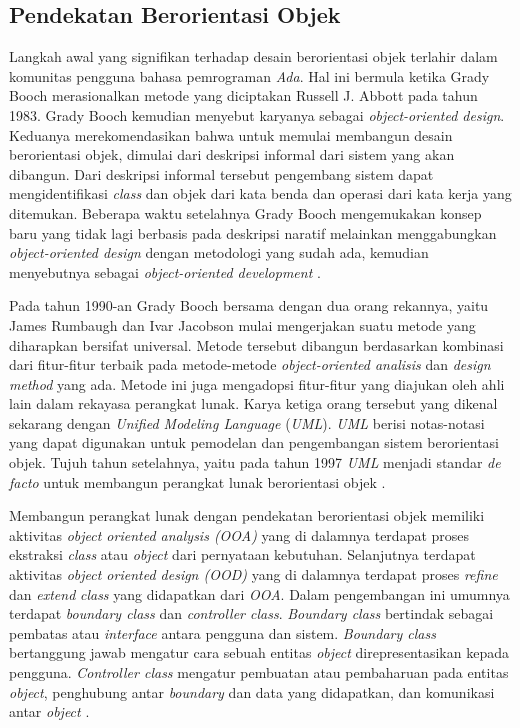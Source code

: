 \subsection{Pendekatan Berorientasi Objek}

Langkah awal yang signifikan terhadap desain berorientasi objek
terlahir dalam komunitas pengguna bahasa pemrograman \emph{Ada}. Hal
ini bermula ketika Grady Booch merasionalkan metode yang diciptakan
Russell J. Abbott pada tahun 1983. Grady Booch kemudian menyebut
karyanya sebagai \emph{object-oriented design}. Keduanya
merekomendasikan bahwa untuk memulai membangun desain berorientasi
objek, dimulai dari deskripsi informal dari sistem yang
akan dibangun. Dari deskripsi informal tersebut pengembang
sistem dapat mengidentifikasi \emph{class} dan objek dari kata benda dan
operasi dari kata kerja yang ditemukan. Beberapa waktu setelahnya
Grady Booch mengemukakan konsep baru yang tidak lagi berbasis pada
deskripsi naratif melainkan menggabungkan \emph{object-oriented
  design} dengan metodologi yang sudah ada, kemudian menyebutnya
sebagai \emph{object-oriented development}
\parencite{capretz2003history}.

Pada tahun 1990-an Grady Booch bersama dengan dua orang rekannya, yaitu
James Rumbaugh dan Ivar Jacobson mulai mengerjakan suatu metode yang
diharapkan bersifat universal. Metode tersebut dibangun berdasarkan
kombinasi dari fitur-fitur terbaik pada metode-metode
\emph{object-oriented analisis} dan \emph{design method} yang
ada. Metode ini juga mengadopsi fitur-fitur yang diajukan oleh ahli
lain dalam rekayasa perangkat lunak. Karya ketiga orang tersebut yang
dikenal sekarang dengan \emph{Unified Modeling
  Language} (\emph{UML}). \emph{UML} berisi notas-notasi yang dapat digunakan
untuk pemodelan dan pengembangan sistem berorientasi objek. Tujuh
tahun setelahnya, yaitu pada tahun 1997 \emph{UML} menjadi standar \emph{de
  facto} untuk membangun perangkat lunak berorientasi objek
\parencite{pressman2010software}.

Membangun perangkat lunak dengan pendekatan berorientasi objek
memiliki aktivitas \emph{object oriented analysis (OOA)} yang di
dalamnya terdapat proses ekstraksi \emph{class} atau \emph{object} dari
pernyataan kebutuhan. Selanjutnya terdapat aktivitas
\emph{object oriented design (OOD)} yang di dalamnya terdapat proses
\emph{refine} dan \emph{extend} \emph{class} yang didapatkan dari
\emph{OOA}. Dalam pengembangan ini umumnya terdapat \emph{boundary
  class} dan \emph{controller class}. \emph{Boundary class} bertindak
sebagai pembatas atau \emph{interface} antara pengguna dan
sistem. \emph{Boundary class} bertanggung jawab mengatur cara sebuah
entitas \emph{object} direpresentasikan kepada
pengguna. \emph{Controller class} mengatur pembuatan atau pembaharuan
pada entitas \emph{object}, penghubung antar \emph{boundary} dan data
yang didapatkan, dan komunikasi antar \emph{object} \parencite{pressman2010software}.


